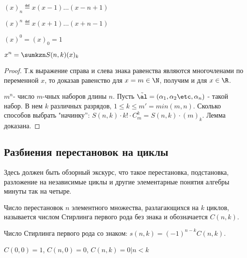 \documentclass[unicode,10pt]{article}
\begin{document}
\begin{denotes}
  $\displaystyle (x)_n\eqdef x(x-1)\dots(x-n+1)$\par
  $\displaystyle (x)^n\eqdef x(x+1)\dots(x+n-1)$ \par
  $\displaystyle (x)^0=(x)_0=1$
\end{denotes}
\begin{lemma}
$\displaystyle x^n = \sumkzn S(n,k) (x)_k$
\end{lemma}
\begin{proof}
  Т.к выражение справа и слева знака равенства являются многочленами по переменной $x$,
  то доказав равенство для $x=m\in\N$, получим и для $x\in\R$.\par
  $m^n$- число $m$-чных наборов длины $n$. Пусть $\alt=(\set{n})$ - такой набор.
  В нем $k$ различных разрядов, $1\le k\le m'=min(m,n)$.
  Сколько способов выбрать "начинку'': $S(n,k)\cdot k!\cdot C_m^k  = S(n,k)\cdot (m)_k$.
  Лемма доказана.
\end{proof}
\subsection{Разбиения перестановок на циклы}
\begin{authornote}
  Здесь должен быть обзорный экскурс, что такое перестановка, подстановка, разложение на независимые
  циклы и другие элементарные понятия алгебры минуты так на четыре.
\end{authornote}
\begin{denote}
  Число перестановок $n$ элементного множества, разлагающихся на $k$ циклов, называется
  числом Стирлинга первого рода без знака и обозначается $C(n,k)$.
\end{denote}
\begin{denote}
  Число Стирлинга первого рода со знаком: $\displaystyle s(n,k) = (-1)^{n-k}C(n,k)$.
\end{denote}
\begin{denote}
  $\displaystyle C(0,0) =1$, $C(n,0) =0$, $C(n,k) = 0|n<k$
\end{denote}
\end{document}
